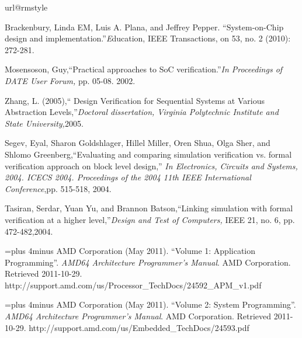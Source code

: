 \begin{thebibliography}{10}
\providecommand{\url}[1]{#1}
\csname url@rmstyle\endcsname
\providecommand{\newblock}{\relax}
\providecommand{\bibinfo}[2]{#2}
\providecommand\BIBentrySTDinterwordspacing{\spaceskip=0pt\relax}
\providecommand\BIBentryALTinterwordstretchfactor{4}
\providecommand\BIBentryALTinterwordspacing{\spaceskip=\fontdimen2\font plus
\BIBentryALTinterwordstretchfactor\fontdimen3\font minus
  \fontdimen4\font\relax}
\providecommand\BIBforeignlanguage[2]{{%
\expandafter\ifx\csname l@#1\endcsname\relax
\typeout{** WARNING: IEEEtran.bst: No hyphenation pattern has been}%
\typeout{** loaded for the language `#1'. Using the pattern for}%
\typeout{** the default language instead.}%
\else
\language=\csname l@#1\endcsname
\fi
#2}}

Brackenbury, Linda EM, Luis A. Plana, and Jeffrey Pepper. ``System-on-Chip design and implementation.''{\emph Education, IEEE Transactions,} on 53, no. 2 (2010): 272-281.

Mosensoson, Guy,``Practical approaches to SoC verification.''\emph{In Proceedings of DATE User Forum,} pp. 05-08. 2002.

Zhang, L. (2005),`` Design Verification for Sequential Systems at Various Abstraction Levels,''\emph{Doctoral dissertation, Virginia Polytechnic Institute and State University,}2005.

Segev, Eyal, Sharon Goldshlager, Hillel Miller, Oren Shua, Olga Sher, and Shlomo Greenberg,``Evaluating and comparing simulation verification vs. formal verification approach on block level design,'' \emph{In Electronics, Circuits and Systems, 2004. ICECS 2004. Proceedings of the 2004 11th IEEE International Conference},pp. 515-518, 2004.

Tasiran, Serdar, Yuan Yu, and Brannon Batson,``Linking simulation with formal verification at a higher level,''\emph{Design and Test of Computers,} IEEE 21, no. 6, pp. 472-482,2004.

\BIBentryALTinterwordspacing
AMD Corporation (May 2011). ``Volume 1: Application Programming''. \emph{AMD64 Architecture Programmer's Manual}. AMD Corporation. Retrieved 2011-10-29.
\url{http://support.amd.com/us/Processor_TechDocs/24592_APM_v1.pdf}
\BIBentrySTDinterwordspacing
 
\BIBentryALTinterwordspacing
AMD Corporation (May 2011). ``Volume 2: System Programming''. \emph{AMD64 Architecture Programmer's Manual}. AMD Corporation. Retrieved 2011-10-29.
\url{http://support.amd.com/us/Embedded_TechDocs/24593.pdf}
\BIBentrySTDinterwordspacing
 

\end{thebibliography}
